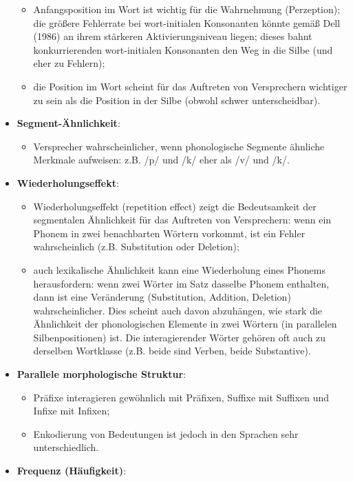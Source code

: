 \documentclass[
  letterpaper,
]{scrbook}
\providecommand{\tightlist}{%
  \setlength{\itemsep}{0pt}\setlength{\parskip}{0pt}}\usepackage{longtable,booktabs,array}
\begin{document}
\begin{itemize}
  \begin{itemize}
  \tightlist
  \item
    Anfangsposition im Wort ist wichtig für die Wahrnehmung
    (Perzeption); die größere Fehlerrate bei wort-initialen Konsonanten
    könnte gemäß Dell (1986) an ihrem stärkeren Aktivierungsniveau
    liegen; dieses bahnt konkurrierenden wort-initialen Konsonanten den
    Weg in die Silbe (und eher zu Fehlern);
  \item
    die Position im Wort scheint für das Auftreten von Versprechern
    wichtiger zu sein als die Position in der Silbe (obwohl schwer
    unterscheidbar).
  \end{itemize}
\item
  \textbf{Segment-Ähnlichkeit}:

  \begin{itemize}
  \tightlist
  \item
    Versprecher wahrscheinlicher, wenn phonologische Segmente ähnliche
    Merkmale aufweisen: z.B. /p/ und /k/ eher als /v/ und /k/.
  \end{itemize}
\item
  \textbf{Wiederholungseffekt}:

  \begin{itemize}
  \tightlist
  \item
    Wiederholungseffekt (repetition effect) zeigt die Bedeutsamkeit der
    segmentalen Ähnlichkeit für das Auftreten von Versprechern: wenn ein
    Phonem in zwei benachbarten Wörtern vorkommt, ist ein Fehler
    wahrscheinlich (z.B. Substitution oder Deletion);
  \item
    auch lexikalische Ähnlichkeit kann eine Wiederholung eines Phonems
    herausfordern: wenn zwei Wörter im Satz dasselbe Phonem enthalten,
    dann ist eine Veränderung (Substitution, Addition, Deletion)
    wahrscheinlicher. Dies scheint auch davon abzuhängen, wie stark die
    Ähnlichkeit der phonologischen Elemente in zwei Wörtern (in
    parallelen Silbenpositionen) ist. Die interagierender Wörter gehören
    oft auch zu derselben Wortklasse (z.B. beide sind Verben, beide
    Substantive).
  \end{itemize}
\item
  \textbf{Parallele morphologische Struktur}:

  \begin{itemize}
  \tightlist
  \item
    Präfixe interagieren gewöhnlich mit Präfixen, Suffixe mit Suffixen
    und Infixe mit Infixen;
  \item
    Enkodierung von Bedeutungen ist jedoch in den Sprachen sehr
    unterschiedlich.
  \end{itemize}
\item
  \textbf{Frequenz (Häufigkeit)}:


\end{itemize}
\end{document}
